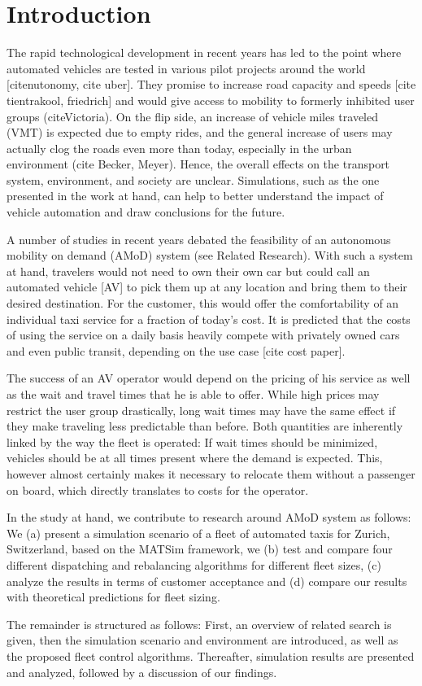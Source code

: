 \section{Introduction}

The rapid technological development in recent years has led to the point where automated vehicles are tested in various pilot projects around the world [citenutonomy, cite uber]. They promise to increase road capacity and speeds [cite tientrakool, friedrich] and would give access to mobility to formerly inhibited user groups (citeVictoria). On the flip side, an increase of vehicle
miles traveled (VMT) is expected due to empty rides, and the general increase of users may actually clog the roads even more than today, especially in the urban environment (cite Becker, Meyer). Hence, the overall effects on the transport system, environment, and society are unclear. Simulations, such as the one presented in the work at hand, can help to better understand the impact of vehicle automation and draw conclusions for the future.

A number of studies in recent years debated the feasibility of an autonomous mobility on demand (AMoD) system (see Related Research). With such a system at hand, travelers would not need to own their own car but could call an automated vehicle [AV]
to pick them up at any location and bring them to their desired destination. For the customer, this would offer the comfortability of an individual taxi service for a fraction of today's cost. It is predicted that the costs of using the service on a daily basis heavily compete with privately owned cars and even public transit, depending on the use case [cite cost paper].

The success of an AV operator would depend on the pricing of his service as well as the wait and travel times that he is able to offer. While high prices may restrict the user group drastically, long wait times may have the same effect if they make traveling less predictable than before. Both quantities are inherently
linked by the way the fleet is operated: If wait times should be minimized, vehicles should be at all times present where the demand is expected. This, however almost certainly makes it necessary to relocate them without a passenger on board, which
directly translates to costs for the operator.

In the study at hand, we contribute to research around AMoD system as follows: We (a) present a simulation scenario of a fleet of automated taxis for Zurich, Switzerland, based on the MATSim framework, we (b) test and compare four different dispatching
and rebalancing algorithms for different fleet sizes, (c) analyze the results in terms of customer acceptance and (d) compare our results with theoretical predictions for fleet sizing.

The remainder is structured as follows: First, an overview of related search is given, then the simulation scenario and environment are introduced, as well as the proposed fleet control algorithms. Thereafter, simulation results are presented and
analyzed, followed by a discussion of our findings.